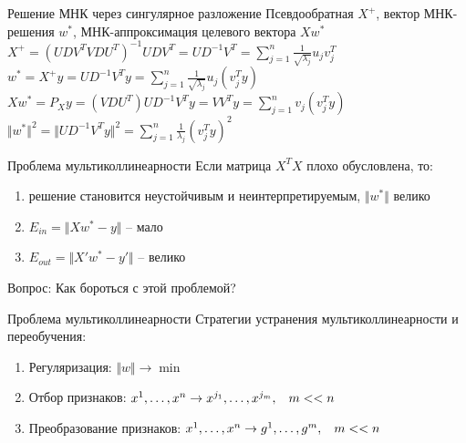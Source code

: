 \documentclass[10pt]{beamer}
\begin{document}
\begin{frame}{Решение МНК через сингулярное разложение}
	Псевдообратная $X^+$, вектор МНК-решения $w^*$,
	МНК-аппроксимация целевого вектора $Xw^*$\\
	\bigbreak
	\pause
	$X^+ = (UDV^TVDU^T)^{-1}UDV^T = UD^{-1}V^T = \sum\limits_{j=1}^n \frac{1}{\sqrt{\lambda_j}}  u_j v_j^T$\\
	\pause
	$ w^* = X^+y = UD^{-1}V^Ty = \sum\limits_{j=1}^n \frac{1}{\sqrt{\lambda_j}}  u_j (v_j^Ty)$\\
	\pause
	$X w^* = P_X y = (VDU^T)UD^{-1}V^Ty = VV^Ty = \sum\limits_{j=1}^n v_j (v_j^Ty)$\\
	\pause
	$\Vert w^* \Vert^2  = \Vert U D^{-1}V^Ty \Vert^2 = \sum\limits_{j=1}^n \frac{1}{\lambda_j} (v_j^Ty)^2$
\end{frame}


\begin{frame}{Проблема мультиколлинеарности}
	Если матрица $X^TX$ плохо обусловлена, то: 
	\begin{enumerate}[--]
		\item решение становится неустойчивым и неинтерпретируемым, $\Vert w^* \Vert $ велико
		\item $E_{in} = \Vert Xw^* -y \Vert$ -- мало   
		\item $E_{out} = \Vert X'w^* -y' \Vert$ -- велико
	\end{enumerate}
	\bigbreak
	\pause
	\alert{Вопрос:} Как бороться с этой проблемой?
\end{frame}

\begin{frame}{Проблема мультиколлинеарности}
	Стратегии устранения мультиколлинеарности и переобучения:
	\begin{enumerate}[--]
		\item Регуляризация: $\Vert w \Vert \rightarrow \min$
		\item Отбор признаков: $x^1, \dots, x^n \rightarrow x^{j_1}, \dots, x^{j_m}, \hspace{3mm} m << n$
		\item Преобразование признаков: $x^1, \dots, x^n \rightarrow g^1, \dots, g^m,\hspace{3mm}  m << n$
	\end{enumerate}
\end{frame}
\end{document}
